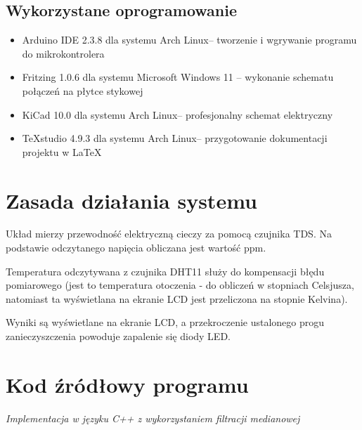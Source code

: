 \documentclass[12pt, a4paper]{article}
\begin{document}
	\subsection{Wykorzystane oprogramowanie \faLaptopCode}
	\begin{tcolorbox}[colback=soft_gray, colframe=black, title=Środowisko programistyczne]
		\begin{itemize}
			\item Arduino IDE 2.3.8 dla systemu Arch Linux\texttrademark – tworzenie i wgrywanie programu do mikrokontrolera
			\item Fritzing 1.0.6 dla systemu Microsoft Windows 11 – wykonanie schematu połączeń na płytce stykowej
			\item KiCad 10.0 dla systemu Arch Linux\texttrademark – profesjonalny schemat elektryczny
			\item TeXstudio 4.9.3 dla systemu Arch Linux\texttrademark – przygotowanie dokumentacji projektu w \LaTeX
		\end{itemize}
	\end{tcolorbox}
	
	\newpage
	
	\section{Zasada działania systemu \faCogs}
	\begin{tcolorbox}[colback=arduino_teal!5,colframe=arduino_teal,title=Opis działania]
		Układ mierzy przewodność elektryczną cieczy za pomocą czujnika TDS. 
		Na podstawie odczytanego napięcia obliczana jest wartość ppm.
		
		Temperatura odczytywana z czujnika DHT11 służy do kompensacji błędu pomiarowego (jest to temperatura otoczenia - do obliczeń w stopniach Celsjusza, natomiast ta wyświetlana na ekranie LCD jest przeliczona na stopnie Kelvina).
		
		Wyniki są wyświetlane na ekranie LCD, a przekroczenie ustalonego progu 
		zanieczyszczenia powoduje zapalenie się diody LED.
	\end{tcolorbox}
	
	\section{Kod źródłowy programu \faCode}
	\begin{center}
		\small \textit{Implementacja w języku C++ z wykorzystaniem filtracji medianowej}
	\end{center}
	
\end{document}
